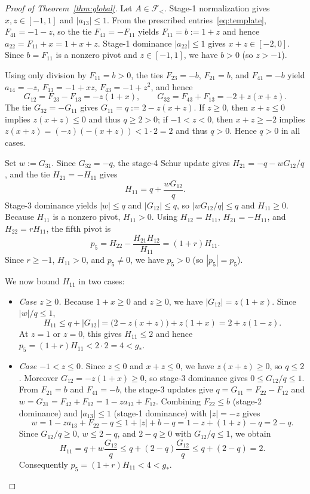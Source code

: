 \documentclass[11pt]{article}
\theoremstyle{remark}
\begin{document}
\begin{proof}[Proof of Theorem~\ref{thm:global}]
Let $A\in\mathcal{F}_{<}$. Stage-1 normalization gives $x,z\in[-1,1]$ and
$|a_{13}|\le 1$. From the prescribed entries~\eqref{eq:template},
$F_{41}=-1-z$, so the tie $F_{41}=-F_{11}$ yields $F_{11}=b:=1+z$ and hence
$a_{22}=F_{11}+x=1+x+z$. Stage-1 dominance $|a_{22}|\le 1$ gives
$x+z\in[-2,0]$. Since $b=F_{11}$ is a nonzero pivot and $z\in[-1,1]$, we have
$b>0$ (so $z>-1$).

Using only division by $F_{11}=b>0$, the ties $F_{23}=-b$, $F_{21}=b$, and
$F_{41}=-b$ yield $a_{14}=-z$, $F_{13}=-1+xz$, $F_{43}=-1+z^2$, and hence
\[
  G_{12} = F_{23} - F_{13} = -z(1+x),
  \qquad
  G_{32} = F_{43} + F_{13} = -2 + z(x+z).
\]
The tie $G_{32}=-G_{11}$ gives $G_{11}=q:=2-z(x+z)$. If $z\ge 0$, then
$x+z\le 0$ implies $z(x+z)\le 0$ and thus $q\ge 2>0$; if $-1<z<0$, then
$x+z\ge -2$ implies $z(x+z) = (-z)(-(x+z)) < 1\cdot 2 = 2$ and thus $q>0$.
Hence $q>0$ in all cases.

Set $w := G_{31}$. Since $G_{32}=-q$, the stage-4 Schur update gives
$H_{21}=-q - wG_{12}/q$, and the tie $H_{21}=-H_{11}$ gives
\[
  H_{11} = q + \frac{wG_{12}}{q}.
\]
Stage-3 dominance yields $|w|\le q$ and $|G_{12}|\le q$, so
$|wG_{12}/q|\le q$ and $H_{11}\ge 0$. Because $H_{11}$ is a nonzero pivot,
$H_{11}>0$. Using $H_{12}=H_{11}$, $H_{21}=-H_{11}$, and $H_{22}=rH_{11}$, the
fifth pivot is
\[
  p_5 = H_{22} - \frac{H_{21}H_{12}}{H_{11}} = (1+r)H_{11}.
\]
Since $r\ge -1$, $H_{11}>0$, and $p_5\ne 0$, we have $p_5>0$ (so $|p_5|=p_5$).

We now bound $H_{11}$ in two cases:
\begin{itemize}
  \item \emph{Case $z\ge 0$.} Because $1+x\ge 0$ and $z\ge 0$, we have
  $|G_{12}| = z(1+x)$. Since $|w|/q\le 1$,
  \[
    H_{11} \le q + |G_{12}| = \bigl(2 - z(x+z)\bigr) + z(1+x) = 2 + z(1-z).
  \]
  At $z=1$ or $z=0$, this gives $H_{11}\le 2$ and hence
  $p_5=(1+r)H_{11} < 2\cdot 2 = 4 < g_*$.

  \item \emph{Case $-1<z\le 0$.} Since $z\le 0$ and $x+z\le 0$, we have
  $z(x+z)\ge 0$, so $q\le 2$. Moreover $G_{12}=-z(1+x)\ge 0$, so stage-3
  dominance gives $0\le G_{12}/q \le 1$. From $F_{21}=b$ and $F_{41}=-b$, the
  stage-3 updates give $q = G_{11} = F_{22}-F_{12}$ and
  $w = G_{31} = F_{42}+F_{12} = 1 - za_{13} + F_{12}$. Combining
  $F_{22}\le b$ (stage-2 dominance) and $|a_{13}|\le 1$ (stage-1 dominance)
  with $|z|=-z$ gives
  \[
    w = 1 - za_{13} + F_{22} - q \le 1 + |z| + b - q = 1 - z + (1+z) - q = 2 - q.
  \]
  Since $G_{12}/q\ge 0$, $w\le 2-q$, and $2-q\ge 0$ with $G_{12}/q\le 1$, we
  obtain
  \[
    H_{11} = q + w\frac{G_{12}}{q} \le q + (2-q)\frac{G_{12}}{q} \le q + (2-q) = 2.
  \]
  Consequently $p_5 = (1+r)H_{11} < 4 < g_*$.
\end{itemize}


\end{proof}
\end{document}
